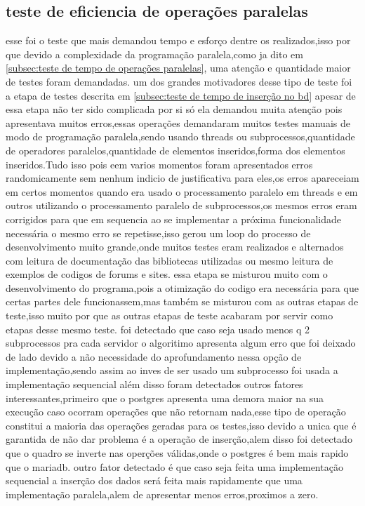 \documentclass[
	12pt,				%
	openright,			%
	oneside,			%
	a4paper,			%
	english,			%
	french,				%
	spanish,			%
	brazil,				%
	]{abntex2}
\begin{document}
\subsection{teste de eficiencia de operações paralelas}
\label{subsec:teste de eficiencia de operações paralelas}
esse foi o teste que mais demandou tempo e esforço dentre os realizados,isso por que devido a complexidade da programação paralela,como ja dito em \autoref{subsec:teste de tempo de operações paralelas}, uma atenção e quantidade maior de testes foram demandadas.
um dos grandes motivadores desse tipo de teste foi a etapa de testes descrita em \autoref{subsec:teste de tempo de inserção no bd} apesar de essa etapa não ter sido complicada por si só ela demandou muita atenção pois apresentava muitos erros,essas operações demandaram muitos testes manuais de modo de programação paralela,sendo usando threads ou subprocessos,quantidade de operadores paralelos,quantidade de elementos inseridos,forma dos elementos inseridos.Tudo isso pois eem varios momentos foram apresentados erros randomicamente sem nenhum indicio de justificativa para eles,os erros apareceiam em certos momentos quando era usado o processamento paralelo em threads e em outros utilizando o processamento paralelo de subprocessos,os mesmos erros eram corrigidos para que em sequencia ao se implementar a próxima funcionalidade necessária o mesmo erro se repetisse,isso gerou um loop do processo de desenvolvimento muito grande,onde muitos testes eram realizados e alternados com leitura de documentação das bibliotecas utilizadas ou mesmo leitura de exemplos de codigos de forums e sites.
essa etapa se misturou muito com o desenvolvimento do programa,pois a otimização do codigo era necessária para que certas partes dele funcionassem,mas também se misturou com as outras etapas de teste,isso muito por que as outras etapas de teste acabaram por servir como etapas desse mesmo teste.
foi detectado que caso seja usado menos q 2 subprocessos pra cada servidor o algoritimo apresenta algum erro que foi deixado de lado devido a não necessidade do aprofundamento nessa opção de implementação,sendo assim ao inves de ser usado um subprocesso foi usada a implementação sequencial
além disso foram detectados outros fatores interessantes,primeiro que o postgres apresenta uma demora maior na sua execução caso ocorram operações que não retornam nada,esse tipo de operação constitui a maioria das operações geradas para os testes,isso devido a unica que é garantida de não dar problema é a operação de inserção,alem disso foi detectado que o quadro se inverte nas operções válidas,onde o postgres é bem mais rapido que o mariadb.
outro fator detectado é que caso seja feita uma implementação sequencial a inserção dos dados será feita mais rapidamente que uma implementação paralela,alem de apresentar menos erros,proximos a zero.
\end{document}
